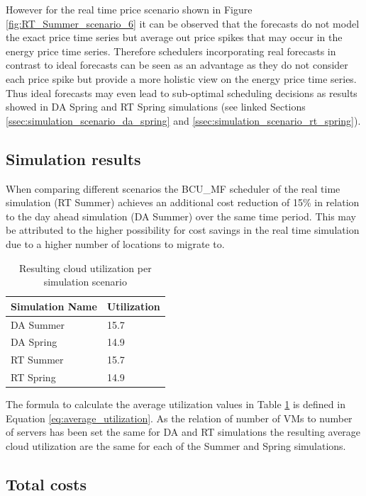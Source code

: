 However for the real time price scenario shown in Figure \ref{fig:RT_Summer_scenario_6} it can be observed that the forecasts do not model the exact price time series but average out price spikes that may occur in the energy price time series. Therefore schedulers incorporating real forecasts in contrast to ideal forecasts can be seen as an advantage as they do not consider each price spike but provide a more holistic view on the energy price time series. Thus ideal forecasts may even lead to sub-optimal scheduling decisions as results showed in DA Spring and RT Spring simulations (see linked Sections \ref{ssec:simulation_scenario_da_spring} and \ref{ssec:simulation_scenario_rt_spring}). 



\subsection{Simulation results}

When comparing different scenarios the BCU\_MF scheduler of the real time simulation (RT Summer) achieves an additional cost reduction of 15\% in relation to the day ahead simulation (DA Summer) over the same time period. 
This may be attributed to the higher possibility for cost savings in the real time simulation due to a higher number of locations to migrate to. 

\begin{table}[htbp]
\centering
\begin{tabular}[\textwidth]{ll}
\toprule
	Simulation Name & Utilization  \\
\midrule
	DA Summer & 15.7 \\
	DA Spring & 14.9 \\
	RT Summer & 15.7 \\
	RT Spring & 14.9 \\
\bottomrule
\end{tabular}
\caption{Resulting cloud utilization per simulation scenario}
\label{tab:cloud_utilization_per_simulation_scenario}
\end{table}

The formula to calculate the average utilization values in Table \ref{tab:cloud_utilization_per_simulation_scenario} is defined in Equation \ref{eq:average_utilization}.
As the relation of number of VMs to number of servers has been set the same for DA and RT simulations the resulting average cloud utilization are the same for each of the Summer and Spring simulations. 

\subsection{Total costs}


